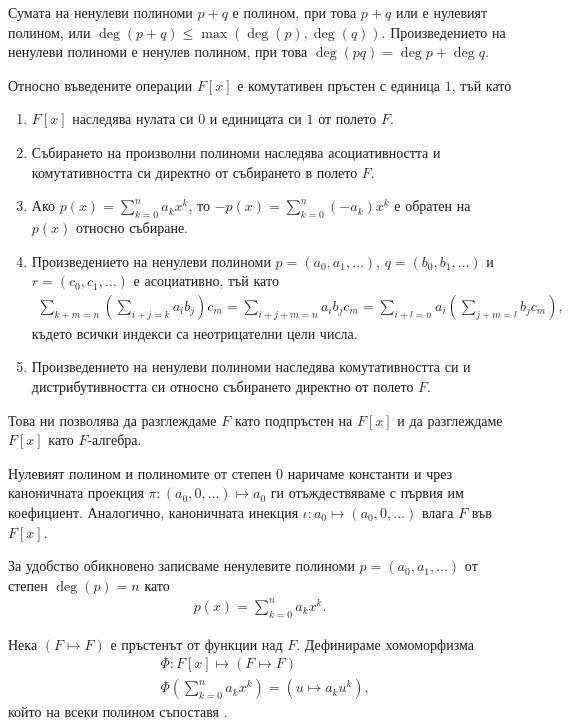 \documentclass[numbers=endperiod, bibliography=totocnumbered]{scrartcl}
\begin{document}
Сумата на ненулеви полиноми \( p + q \) е полином, при това \( p + q \) или е нулевият полином, или \( \deg(p + q) \leq \max(\deg(p), \deg(q)) \). Произведението на ненулеви полиноми е ненулев полином, при това \( \deg(pq) = \deg p + \deg q \).

Относно въведените операции \( F[x] \) е комутативен пръстен с единица \( 1 \), тъй като
\begin{enumerate}
  \item \( F[x] \) наследява нулата си \( 0 \) и единицата си \( 1 \) от полето \( F \).
  \item Събирането на произволни полиноми наследява асоциативността и комутативността си директно от събирането в полето \( F \).
  \item Ако \( p(x) = \sum_{k=0}^n a_k x^k \), то \( -p(x) = \sum_{k=0}^n (-a_k) x^k \) е обратен на \( p(x) \) относно събиране.
  \item Произведението на ненулеви полиноми \( p = (a_0, a_1, \ldots) \), \( q = (b_0, b_1, \ldots) \) и \( r = (c_0, c_1, \ldots) \) е асоциативно, тъй като
  \begin{align*}
    \sum_{k+m=n} \left(\sum_{i+j=k} a_i b_j \right) c_m
    =
    \sum_{i+j+m=n} a_i b_j c_m
    =
    \sum_{i+l=n} a_i \left( \sum_{j+m=l} b_j c_m \right),
  \end{align*}
  където всички индекси са неотрицателни цели числа.
  \item Произведението на ненулеви полиноми наследява комутативността си и дистрибутивността си относно събирането директно от полето \( F \).
\end{enumerate}

Това ни позволява да разглеждаме \( F \) като подпръстен на \( F[x] \) и да разглеждаме \( F[x] \) като \( F \)-алгебра.

Нулевият полином и полиномите от степен \( 0 \) наричаме константи и чрез каноничната проекция \( \pi: (a_0, 0, \ldots) \mapsto a_0 \) ги отъждествяваме с първия им коефициент. Аналогично, каноничната инекция \( \iota: a_0 \mapsto (a_0, 0, \ldots) \) влага \( F \) във \( F[x] \).

За удобство обикновено записваме ненулевите полиноми \( p = (a_0, a_1, \ldots) \) от степен \( \deg(p) = n \) като
\begin{align*}
  p(x) = \sum_{k=0}^n a_k x^k.
\end{align*}

Нека \( (F \mapsto F) \) е пръстенът от функции над \( F \). Дефинираме хомоморфизма
\begin{align*}
  &\Phi: F[x] \mapsto (F \mapsto F) \\
  &\Phi\left( \sum_{k=0}^n a_k x^k \right) = \left( u \mapsto a_k u^k \right),
\end{align*}
който на всеки полином съпоставя .
\end{document}

